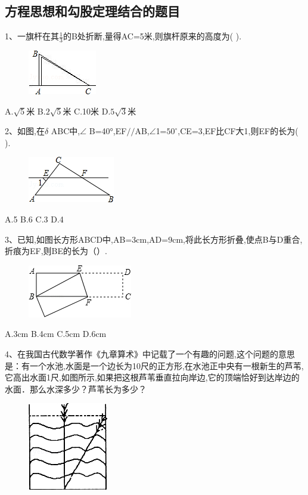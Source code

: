 \documentclass[14pt,UTF-8,a4paper,titlepage]{ctexbook}
\begin{document}
\subsection{方程思想和勾股定理结合的题目}
1、一旗杆在其$\frac{1}{3} $的B处折断,量得AC=5米,则旗杆原来的高度为(   ).\\
\begin{figure}[h]
\includegraphics[scale=1]{2.jpg}
\end{figure}
A.$\sqrt{5}$米 \hfill B.$2\sqrt{5}$米 \hfill  C.10米 \hfill  D.$5\sqrt{3}$米\par
2、如图,在$\delta $ ABC中,$\angle$ B=40°,EF$//$AB,$\angle$1=$50^{\circ}$,CE=3,EF比CF大1,则EF的长为( ).\\
\begin{figure}[h]
\includegraphics[scale=1]{3.jpg}
\end{figure}
A.5 \hfill B.6 \hfill  C.3 \hfill  D.4\par
3、已知,如图长方形ABCD中,AB=3cm,AD=9cm,将此长方形折叠,使点B与D重合,折痕为EF,则BE的长为（）.\\
\begin{figure}[h]
\includegraphics[scale=1]{4.jpg}
\end{figure}
A.3cm \hfill B.4cm \hfill  C.5cm \hfill  D.6cm \par
4、在我国古代数学著作《九章算术》中记载了一个有趣的问题,这个问题的意思是：有一个水池,水面是一个边长为10尺的正方形,在水池正中央有一根新生的芦苇,它高出水面1尺,如图所示,如果把这根芦苇垂直拉向岸边,它的顶端恰好到达岸边的水面．那么水深多少？芦苇长为多少？\par
\begin{figure}[h]
\includegraphics[scale=0.6]{5.jpg}
\end{figure}
\end{document}

